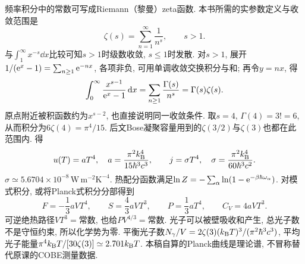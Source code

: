 频率积分中的常数可写成Riemann（黎曼）zeta函数. 本书所需的实参数定义与收敛范围是
\[\zeta(s)=\sum_{n=1}^{\infty}\frac1{n^s},\qquad s>1.\]
与$\int_1^\infty x^{-s}\dd x$比较可知$s>1$时级数收敛, $s\le1$时发散. 对$s>1$, 展开$1/(\mathrm e^x-1)=\sum_{n\ge1}\mathrm e^{-nx}$, 各项非负, 可用单调收敛交换积分与和; 再令$y=nx$, 得
\[\int_0^\infty\frac{x^{s-1}}{\mathrm e^x-1}\,\mathrm d x=\sum_{n\ge1}\frac{\Gamma(s)}{n^s}=\Gamma(s)\zeta(s).\]
原点附近被积函数约为$x^{s-2}$, 也直接说明同一收敛条件. 取$s=4$, $\Gamma(4)=3!=6$, 从而积分为$6\zeta(4)=\pi^4/15$. 后文Bose凝聚容量用到的$\zeta(3/2)$与$\zeta(3)$也都在此范围内. 得
\[
u(T)=aT^4,\quad a=\frac{\pi^2k_{\mathrm B}^4}{15\hbar^3c^3},\qquad
j=\sigma T^4,\quad\sigma=\frac{\pi^2k_{\mathrm B}^4}{60\hbar^3c^2}.
\]
$\sigma\simeq5.6704\times10^{-8}\,\mathrm{W\,m^{-2}K^{-4}}$. 热配分函数满足$\ln Z=-\sum_\alpha\ln(1-\mathrm e^{-\beta\hbar\omega_\alpha})$. 对模式积分, 或将Planck式积分分部得到
\[
F=-\frac13aVT^4,\qquad S=\frac43aVT^3,\qquad P=\frac13aT^4,\qquad C_V=4aVT^3.
\]
可逆绝热路径$VT^3=\text{常数}$, 也给$PV^{4/3}=\text{常数}$. 光子可以被壁吸收和产生, 总光子数不是守恒约束, 所以化学势为零. 平衡光子数$N_\gamma/V=2\zeta(3)(k_{\mathrm B} T)^3/(\pi^2\hbar^3c^3)$, 平均光子能量$\pi^4k_{\mathrm B} T/[30\zeta(3)]\simeq2.701k_{\mathrm B} T$. 本稿自算的Planck曲线是理论谱, 不冒称替代原课的COBE测量数据.
